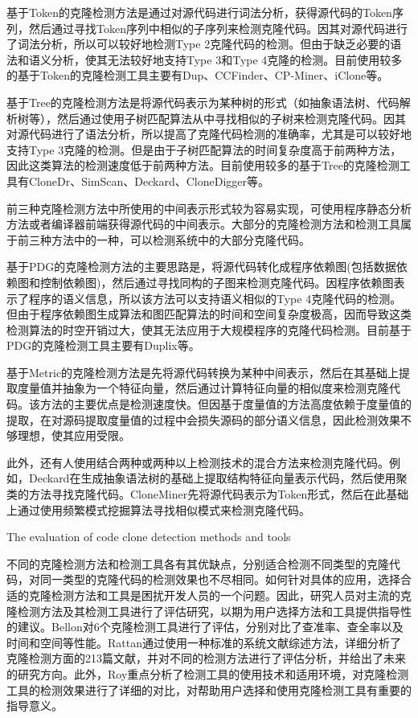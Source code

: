 基于Token的克隆检测方法是通过对源代码进行词法分析，获得源代码的Token序列，然后通过寻找Token序列中相似的子序列来检测克隆代码。因其对源代码进行了词法分析，所以可以较好地检测Type 2克隆代码的检测。但由于缺乏必要的语法和语义分析，使其无法较好地支持Type 3和Type 4克隆的检测。目前使用较多的基于Token的克隆检测工具主要有Dup\cite{baker1995finding}、CCFinder\cite{kamiya2002ccfinder}、CP-Miner\cite{li2006cp}、iClone\cite{gode2009incremental}等。

基于Tree的克隆检测方法是将源代码表示为某种树的形式（如抽象语法树、代码解析树等），然后通过使用子树匹配算法从中寻找相似的子树来检测克隆代码。因其对源代码进行了语法分析，所以提高了克隆代码检测的准确率，尤其是可以较好地支持Type 3克隆的检测。但是由于子树匹配算法的时间复杂度高于前两种方法，因此这类算法的检测速度低于前两种方法。目前使用较多的基于Tree的克隆检测工具有CloneDr\cite{baxter1998clone}、SimScan\cite{SimScan}、Deckard\cite{jiang2007deckard}、CloneDigger\cite{bulychev2008duplicate}等。

前三种克隆检测方法中所使用的中间表示形式较为容易实现，可使用程序静态分析方法或者编译器前端获得源代码的中间表示。大部分的克隆检测方法和检测工具属于前三种方法中的一种，可以检测系统中的大部分克隆代码。

基于PDG的克隆检测方法的主要思路是，将源代码转化成程序依赖图(包括数据依赖图和控制依赖图)，然后通过寻找同构的子图来检测克隆代码。因程序依赖图表示了程序的语义信息，所以该方法可以支持语义相似的Type 4克隆代码的检测。但由于程序依赖图生成算法和图匹配算法的时间和空间复杂度极高，因而导致这类检测算法的时空开销过大，使其无法应用于大规模程序的克隆代码检测。目前基于PDG的克隆检测工具主要有Duplix\cite{krinke2001identifying}等。

基于Metric的克隆检测方法是先将源代码转换为某种中间表示，然后在其基础上提取度量值并抽象为一个特征向量，然后通过计算特征向量的相似度来检测克隆代码。该方法的主要优点是检测速度快。但因基于度量值的方法高度依赖于度量值的提取，在对源码提取度量值的过程中会损失源码的部分语义信息，因此检测效果不够理想，使其应用受限。

此外，还有人使用结合两种或两种以上检测技术的混合方法来检测克隆代码。例如，Deckard在生成抽象语法树的基础上提取结构特征向量表示代码，然后使用聚类的方法寻找克隆代码\cite{jiang2007deckard}。CloneMiner先将源代码表示为Token形式，然后在此基础上通过使用频繁模式挖掘算法寻找相似模式来检测克隆代码\cite{basit2009data}。


{The evaluation of code clone detection methods and tools}

不同的克隆检测方法和检测工具各有其优缺点，分别适合检测不同类型的克隆代码，对同一类型的克隆代码的检测效果也不尽相同。如何针对具体的应用，选择合适的克隆检测方法和工具是困扰开发人员的一个问题。因此，研究人员对主流的克隆检测方法及其检测工具进行了评估研究，以期为用户选择方法和工具提供指导性的建议。Bellon对6个克隆检测工具进行了评估，分别对比了查准率、查全率以及时间和空间等性能\cite{bellon2007comparison}。Rattan通过使用一种标准的系统文献综述方法，详细分析了克隆检测方面的213篇文献，并对不同的检测方法进行了评估分析，并给出了未来的研究方向\cite{rattan2013software}。此外，Roy重点分析了检测工具的使用技术和适用环境，对克隆检测工具的检测效果进行了详细的对比，对帮助用户选择和使用克隆检测工具有重要的指导意义\cite{roy2009comparison}\cite{svajlenko2014evaluating}。

